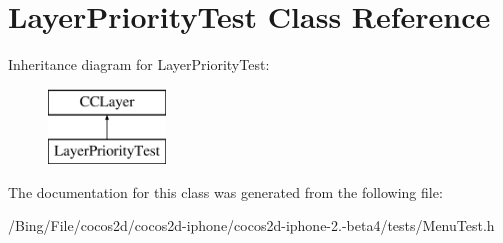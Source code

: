 \hypertarget{interface_layer_priority_test}{\section{Layer\-Priority\-Test Class Reference}
\label{interface_layer_priority_test}
}
Inheritance diagram for Layer\-Priority\-Test\-:\begin{figure}[H]
\begin{center}
\leavevmode
\includegraphics[height=2.000000cm]{interface_layer_priority_test}
\end{center}
\end{figure}


The documentation for this class was generated from the following file\-:\begin{DoxyCompactItemize}
\item 
/\-Bing/\-File/cocos2d/cocos2d-\/iphone/cocos2d-\/iphone-\/2.-\/beta4/tests/Menu\-Test.\-h\end{DoxyCompactItemize}
